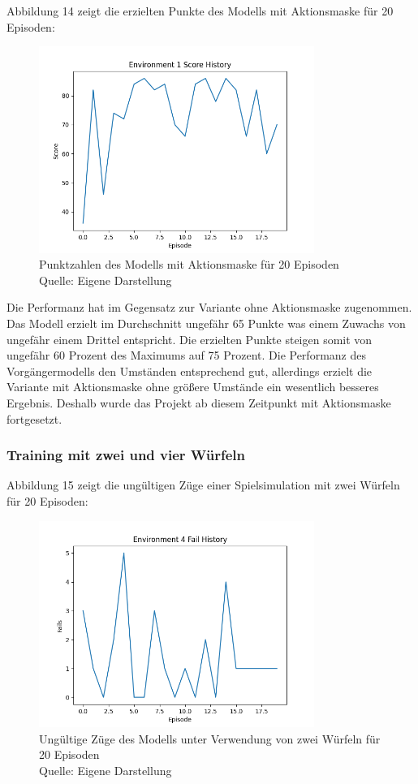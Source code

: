 Abbildung 14 zeigt die erzielten Punkte des Modells mit Aktionsmaske für 20 Episoden:
\nopagebreak
\begin{figure}[H]
	\centering
	\includegraphics[width=0.8\textwidth]{Bilder/trainingwithactionmask} 
	\caption[Punktzahlen des Modells mit Aktionsmaske für 20 Episoden]{Punktzahlen des Modells mit Aktionsmaske für 20 Episoden\\ Quelle: Eigene Darstellung}
\end{figure}

Die Performanz hat im Gegensatz zur Variante ohne Aktionsmaske zugenommen. Das Modell erzielt im Durchschnitt ungefähr 65 Punkte was einem Zuwachs von ungefähr einem Drittel entspricht. Die erzielten Punkte steigen somit von ungefähr 60 Prozent des Maximums auf 75 Prozent. Die Performanz des Vorgängermodells den Umständen entsprechend gut, allerdings erzielt die Variante mit Aktionsmaske ohne größere Umstände ein wesentlich besseres Ergebnis. Deshalb wurde das Projekt ab diesem Zeitpunkt mit Aktionsmaske fortgesetzt.
\subsubsection{Training mit zwei und vier Würfeln}
Abbildung 15 zeigt die ungültigen Züge einer Spielsimulation mit zwei Würfeln für 20 Episoden:
\nopagebreak
\begin{figure}[H]
	\centering
	\includegraphics[width=0.8\textwidth]{Bilder/failswithtwodice} 
	\caption[Ungültige Züge des Modells unter Verwendung von zwei Würfeln für 20 Episoden]{Ungültige Züge des Modells unter Verwendung von zwei Würfeln für 20 Episoden\\ Quelle: Eigene Darstellung}
\end{figure}

